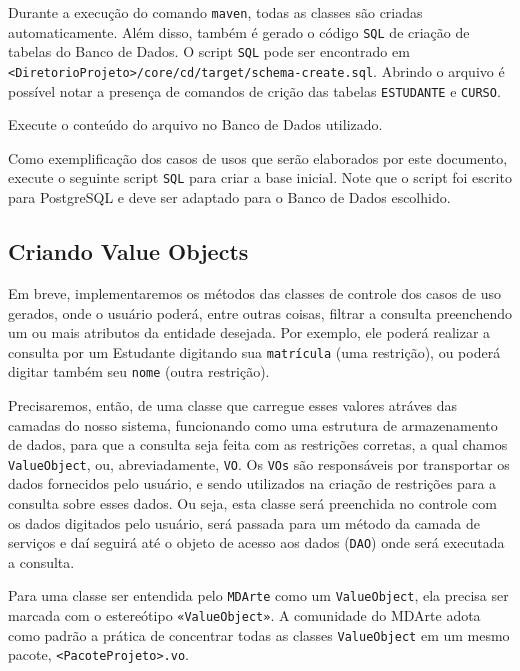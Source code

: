 Durante a execução do comando \texttt{maven}, todas as classes são criadas
automaticamente. Além disso, também é gerado o código \texttt{SQL} de criação de
tabelas do Banco de Dados. O script \texttt{SQL} pode ser encontrado em
\texttt{<DiretorioProjeto>/core/cd/target/schema-create.sql}. Abrindo o arquivo
é possível notar a presença de comandos de crição das tabelas \texttt{ESTUDANTE}
e \texttt{CURSO}.

Execute o conteúdo do arquivo no Banco de Dados utilizado.

Como exemplificação dos casos de usos que serão elaborados por este documento,
execute o seguinte script \texttt{SQL} para criar a base inicial. Note que o
script foi escrito para PostgreSQL e deve ser adaptado para o Banco de Dados
escolhido.

\begin{framed}
	
\end{framed}

\subsection{Criando Value Objects}

Em breve, implementaremos os métodos das classes de controle dos casos de uso
gerados, onde o usuário poderá, entre outras coisas, filtrar a consulta
preenchendo um ou mais atributos da entidade desejada. Por exemplo, ele poderá
realizar a consulta por um Estudante digitando sua \texttt{matrícula} (uma
restrição), ou poderá digitar também seu \texttt{nome} (outra restrição).

Precisaremos, então, de uma classe que carregue esses valores atráves das
camadas do nosso sistema, funcionando como uma estrutura de armazenamento de
dados, para que a consulta seja feita com as restrições corretas, a qual chamos
\texttt{ValueObject}, ou, abreviadamente, \texttt{VO}. Os \texttt{VOs} são
responsáveis por transportar os dados fornecidos pelo usuário, e sendo
utilizados na criação de restrições para a consulta sobre esses dados. Ou seja,
esta classe será preenchida no controle com os dados digitados pelo usuário,
será passada para um método da camada de serviços e daí seguirá até o objeto de
acesso aos dados (\texttt{DAO}) onde será executada a consulta.

Para uma classe ser entendida pelo \texttt{MDArte} como um \texttt{ValueObject},
ela precisa ser marcada com o estereótipo \texttt{«ValueObject»}. A comunidade
do MDArte adota como padrão a prática de concentrar todas as classes
\texttt{ValueObject} em um mesmo pacote, \texttt{<PacoteProjeto>.vo}.

